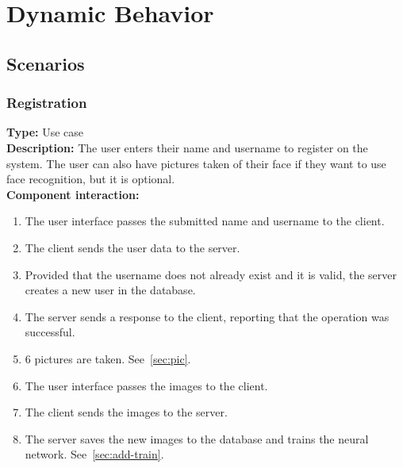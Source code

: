 \documentclass[11pt]{article}
\begin{document}
\section{Dynamic Behavior}
\subsection{Scenarios}

\subsubsection{Registration}
\textbf{Type:} Use case\\
\textbf{Description:} The user enters their name and username to register on the system.
The user can also have pictures taken of their face if they want to use face recognition,
but it is optional.\\
\textbf{Component interaction:} 
\begin{enumerate} 
\item{The user interface passes the submitted name and username to the client.}
\item{The client sends the user data to the server.}
\item{Provided that the username does not already exist and it is valid, the server creates a new user in the database.}
\item{The server sends a response to the client, reporting that the operation was successful.}
\item{6 pictures are taken. See~\ref{sec:pic}.}
\item{The user interface passes the images to the client.}
\item{The client sends the images to the server.}
\item{The server saves the new images to the database and trains the neural network. See~\ref{sec:add-train}.}
\end{enumerate}
\end{document}
